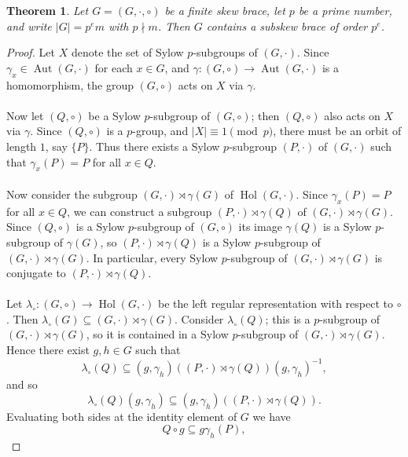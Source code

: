 \documentclass[10pt,a4paper]{amsart}
\newtheorem{theorem}{Theorem}
\DeclareMathOperator{\Aut}{\mbox{Aut}}
\DeclareMathOperator{\Hol}{\mbox{Hol}}
\begin{document}
\begin{theorem} \label{thm_Sylow}
Let $ G=(G,\cdot,\circ) $ be a finite skew brace, let $ p $ be a prime number, and write $ |G|=p^{e}m $ with $ p \nmid m $. Then $ G $ contains a subskew brace of order $ p^{e} $. 
\end{theorem}

\begin{proof}
Let $ X $ denote the set of Sylow $ p $-subgroups of $ (G,\cdot) $. Since $ \gamma_{x} \in \Aut(G,\cdot) $ for each $ x \in G $, and $ \gamma : (G,\circ) \rightarrow \Aut(G,\cdot) $ is a homomorphism, the group $ (G,\circ) $ acts on $ X $ via $ \gamma $. 
\\ \\
Now let $ (Q,\circ) $ be a Sylow $ p $-subgroup of $ (G,\circ) $; then $ (Q,\circ) $ also acts on $ X $ via $ \gamma $. Since $ (Q,\circ) $ is a $ p $-group, and $ |X| \equiv 1 \pmod{p} $, there must be an orbit of length $ 1 $, say $ \{ P \} $. Thus there exists a Sylow $ p $-subgroup $ (P,\cdot) $ of $ (G,\cdot) $ such that $ \gamma_{x}(P)=P $ for all $ x \in Q $. 
\\ \\
Now consider the subgroup $ (G,\cdot) \rtimes \gamma(G) $ of $ \Hol(G,\cdot) $. Since $ \gamma_{x}(P)=P $ for all $ x \in Q $, we can construct a subgroup $ (P,\cdot) \rtimes \gamma(Q) $ of $ (G,\cdot) \rtimes \gamma(G) $. Since $ (Q,\circ) $ is a Sylow $ p $-subgroup of  $ (G,\circ) $ its image $ \gamma(Q) $ is a Sylow $ p $-subgroup of $ \gamma(G) $, so $ (P,\cdot) \rtimes \gamma(Q) $ is a Sylow $ p $-subgroup of $ (G,\cdot) \rtimes \gamma(G) $. In particular, every Sylow $ p $-subgroup of $ (G,\cdot) \rtimes \gamma(G) $ is conjugate to $ (P,\cdot) \rtimes \gamma(Q) $.
\\ \\
Let $ \lambda_{\circ} : (G,\circ) \rightarrow \Hol(G,\cdot) $ be the left regular representation with respect to $ \circ $. Then $ \lambda_{\circ}(G) \subseteq (G,\cdot) \rtimes \gamma(G) $. Consider $ \lambda_{\circ}(Q) $; this is a $ p $-subgroup of $ (G,\cdot) \rtimes \gamma(G) $, so it is contained in a Sylow $ p $-subgroup of $ (G,\cdot) \rtimes \gamma(G) $. Hence there exist $ g,h \in G $ such that 
\[ \lambda_{\circ}(Q) \subseteq (g,\gamma_{h})\left( (P,\cdot) \rtimes \gamma(Q) \right) (g,\gamma_{h})^{-1}, \]
and so
\[ \lambda_{\circ}(Q) (g,\gamma_{h}) \subseteq (g,\gamma_{h})\left( (P,\cdot) \rtimes \gamma(Q) \right). \] 
Evaluating both sides at the identity element of $ G $ we have 
\[ Q \circ g \subseteq g \gamma_{h}(P), \]

\end{proof}
\end{document}
